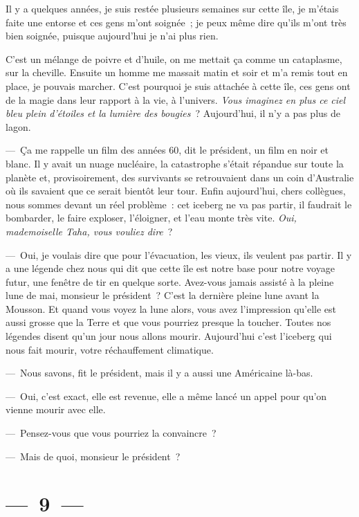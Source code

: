 \documentclass[french,twoside]{book} %
\begin{document}
Il y a quelques années, je suis restée plusieurs semaines sur cette île, je m’étais faite une entorse et ces gens m’ont soignée ; je peux même dire qu’ils m’ont très bien soignée, puisque aujourd’hui je n’ai plus rien.\par
C’est un mélange de poivre et d’huile, on me mettait ça comme un cataplasme, sur la cheville. Ensuite un homme me massait matin et soir et m’a remis tout en place, je pouvais marcher. C’est pourquoi je suis attachée à cette île, ces gens ont de la magie dans leur rapport à la vie, à l’univers. \emph{Vous imaginez en plus ce ciel bleu plein d’étoiles et la lumière des bougies} ? Aujourd’hui, il n’y a pas plus de lagon.\par
— Ça me rappelle un film des années 60, dit le président, un film en noir et blanc. Il y avait un nuage nucléaire, la catastrophe s’était répandue sur toute la planète et, provisoirement, des survivants se retrouvaient dans un coin d’Australie où ils savaient que ce serait bientôt leur tour. Enfin aujourd’hui, chers collègues, nous sommes devant un réel problème : cet iceberg ne va pas partir, il faudrait le bombarder, le faire exploser, l’éloigner, et l’eau monte très vite. \emph{Oui, mademoiselle Taha, vous vouliez dire} ?\par
— Oui, je voulais dire que pour l’évacuation, les vieux, ils veulent pas partir. Il y a une légende chez nous qui dit que cette île est notre base pour notre voyage futur, une fenêtre de tir en quelque sorte. Avez-vous jamais assisté à la pleine lune de mai, monsieur le président ? C’est la dernière pleine lune avant la Mousson. Et quand vous voyez la lune alors, vous avez l’impression qu’elle est aussi grosse que la Terre et que vous pourriez presque la toucher. Toutes nos légendes disent qu’un jour nous allons mourir. Aujourd’hui c’est l’iceberg qui nous fait mourir, votre réchauffement climatique.\par
— Nous savons, fit le président, mais il y a aussi une Américaine là-bas.\par
— Oui, c’est exact, elle est revenue, elle a même lancé un appel pour qu’on vienne mourir avec elle.\par
— Pensez-vous que vous pourriez la convaincre ?\par
— Mais de quoi, monsieur le président ?

\section[{— 9 —}]{— 9 —}
\renewcommand{\leftmark}{— 9 —}
\end{document}
